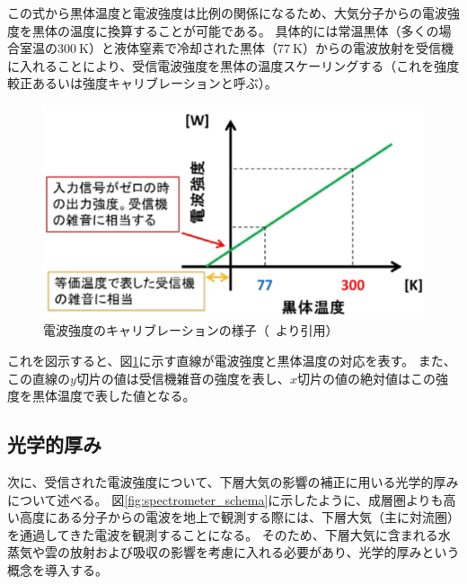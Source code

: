 この式から黒体温度と電波強度は比例の関係になるため、大気分子からの電波強度を黒体の温度に換算することが可能である。
具体的には常温黒体（多くの場合室温の$300\ \mathrm{K}$）と液体窒素で冷却された黒体（$77\ \mathrm{K}$）からの電波放射を受信機に入れることにより、受信電波強度を黒体の温度スケーリングする（これを強度較正あるいは強度キャリブレーションと呼ぶ）。
\begin{figure}[htbp]
    \centering
    \includegraphics[scale=0.6]{master_thesis_contents/master_thesis_fig/calibration.pdf}
    \caption{電波強度のキャリブレーションの様子（~\cite{ito2017master}より引用）}
    \label{fig:calibration}
\end{figure}
これを図示すると、図\ref{fig:calibration}に示す直線が電波強度と黒体温度の対応を表す。
また、この直線の$y$切片の値は受信機雑音の強度を表し、$x$切片の値の絶対値はこの強度を黒体温度で表した値となる。


\subsection{光学的厚み}
\label{subsec:opticaldepth}
次に、受信された電波強度について、下層大気の影響の補正に用いる光学的厚みについて述べる。
図\ref{fig:spectrometer_schema}に示したように、成層圏よりも高い高度にある分子からの電波を地上で観測する際には、下層大気（主に対流圏）を通過してきた電波を観測することになる。
そのため、下層大気に含まれる水蒸気や雲の放射および吸収の影響を考慮に入れる必要があり、光学的厚みという概念を導入する。\par


